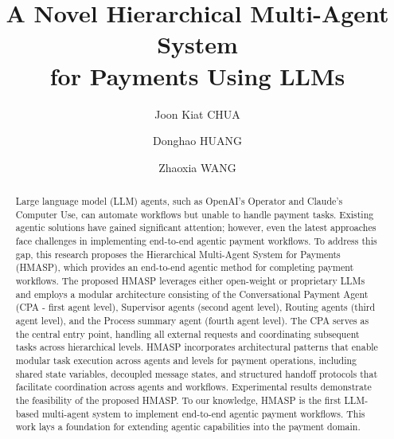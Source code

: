 \documentclass[runningheads]{llncs}
\renewcommand{\thefootnote}{\fnsymbol{footnote}}
\begin{document}
%
\title{A Novel Hierarchical Multi-Agent System \\ for
Payments Using LLMs}
%
%
\author{
Joon Kiat CHUA 
\and
Donghao HUANG 
\and
Zhaoxia WANG 
}


%
%


\setcounter{footnote}{0} 
\renewcommand{\thefootnote}{\arabic{footnote}}

\maketitle              %
%
\begin{abstract}
Large language model (LLM) agents, such as OpenAI’s Operator and Claude’s Computer Use, can automate workflows but unable to handle payment tasks. Existing agentic solutions have gained significant attention; however, even the latest approaches face challenges in implementing end-to-end agentic payment workflows. To address this gap, this research proposes the Hierarchical Multi-Agent System for Payments (HMASP), which provides an end-to-end agentic method for completing payment workflows. The proposed HMASP leverages either open-weight or proprietary LLMs and employs a modular architecture consisting of the Conversational Payment Agent (CPA - first agent level), Supervisor agents (second agent level), Routing agents (third agent level), and the Process summary agent (fourth agent level). The CPA serves as the central entry point, handling all external requests and coordinating subsequent tasks across hierarchical levels. HMASP incorporates architectural patterns that enable modular task execution across agents and levels for payment operations, including shared state variables, decoupled message states, and structured handoff protocols that facilitate coordination across agents and workflows. Experimental results demonstrate the feasibility of the proposed HMASP. To our knowledge, HMASP is the first LLM-based multi-agent system to implement end-to-end agentic payment workflows. This work lays a foundation for extending agentic capabilities into the payment domain.

\end{abstract}
\end{document}
